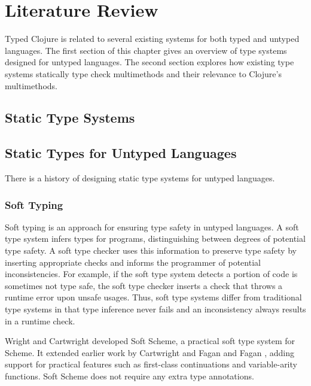 
\chapter{Literature Review}

Typed Clojure is related to several existing systems for both typed and untyped languages.
The first section of this chapter gives an overview of type systems designed for untyped languages.
The second section explores how existing type systems statically type check multimethods
and their relevance to Clojure's multimethods.

\section{Static Type Systems}


\section{Static Types for Untyped Languages}

There is a history of designing static type systems for untyped languages. 

\subsection{Soft Typing}

Soft typing\cite{CF91}
is an approach for ensuring type safety in untyped languages.
A soft type system infers types for programs, distinguishing between degrees
of potential type safety.
A soft type checker uses this information to 
preserve type safety by inserting appropriate checks 
and informs the programmer of potential inconsistencies.
For example, if the soft type system detects a portion of code is sometimes not type safe,
the soft type checker inserts a check that throws a runtime error upon unsafe usages.
Thus, soft type systems differ from traditional type systems in that type inference 
never fails and an inconsistency always results in a runtime check.

Wright and Cartwright\cite{WC97} developed Soft Scheme, a practical
soft type system for Scheme. 
It extended earlier work by Cartwright and Fagan\cite{CF91}
and Fagan \cite{Fag92}, adding support for practical features such as
first-class continuations and variable-arity functions.
Soft Scheme does not require any extra type annotations.

